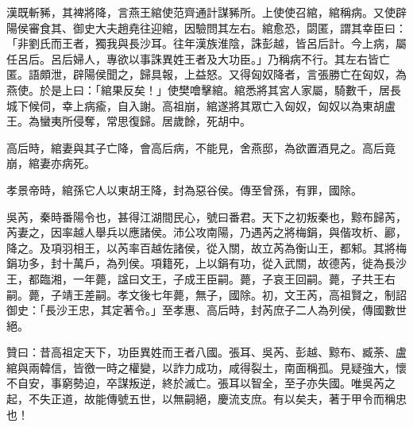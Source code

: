 \begin{pinyinscope}
漢既斬豨，其裨將降，言燕王綰使范齊通計謀豨所。上使使召綰，綰稱病。又使辟陽侯審食其、御史大夫趙堯往迎綰，因驗問其左右。綰愈恐，閟匿，謂其幸臣曰：「非劉氏而王者，獨我與長沙耳。往年漢族淮陰，誅彭越，皆呂后計。今上病，屬任呂后。呂后婦人，專欲以事誅異姓王者及大功臣。」乃稱病不行。其左右皆亡匿。語頗泄，辟陽侯聞之，歸具報，上益怒。又得匈奴降者，言張勝亡在匈奴，為燕使。於是上曰：「綰果反矣！」使樊噲擊綰。綰悉將其宮人家屬，騎數千，居長城下候伺，幸上病瘉，自入謝。高祖崩，綰遂將其眾亡入匈奴，匈奴以為東胡盧王。為蠻夷所侵奪，常思復歸。居歲餘，死胡中。

高后時，綰妻與其子亡降，會高后病，不能見，舍燕邸，為欲置酒見之。高后竟崩，綰妻亦病死。

孝景帝時，綰孫它人以東胡王降，封為惡谷侯。傳至曾孫，有罪，國除。

吳芮，秦時番陽令也，甚得江湖間民心，號曰番君。天下之初叛秦也，黥布歸芮，芮妻之，因率越人舉兵以應諸侯。沛公攻南陽，乃遇芮之將梅鋗，與偕攻析、酈，降之。及項羽相王，以芮率百越佐諸侯，從入關，故立芮為衡山王，都邾。其將梅鋗功多，封十萬戶，為列侯。項籍死，上以鋗有功，從入武關，故德芮，徙為長沙王，都臨湘，一年薨，諡曰文王，子成王臣嗣。薨，子哀王回嗣。薨，子共王右嗣。薨，子靖王差嗣。孝文後七年薨，無子，國除。初，文王芮，高祖賢之，制詔御史：「長沙王忠，其定著令。」至孝惠、高后時，封芮庶子二人為列侯，傳國數世絕。

贊曰：昔高祖定天下，功臣異姓而王者八國。張耳、吳芮、彭越、黥布、臧荼、盧綰與兩韓信，皆徼一時之權變，以詐力成功，咸得裂土，南面稱孤。見疑強大，懷不自安，事窮勢迫，卒謀叛逆，終於滅亡。張耳以智全，至子亦失國。唯吳芮之起，不失正道，故能傳號五世，以無嗣絕，慶流支庶。有以矣夫，著于甲令而稱忠也！


\end{pinyinscope}